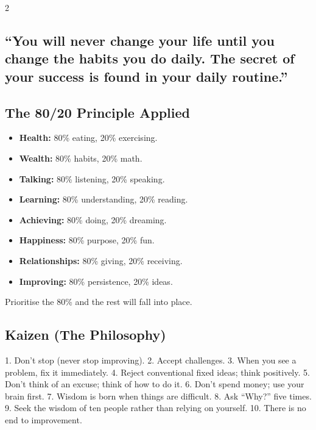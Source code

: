 \documentclass[10pt,a4paper]{article}
\begin{document}
\begin{multicols}{2}
\subsection{``You will never change your life until you change the habits you do daily. The secret of your success is found in your daily routine.''}

\subsection{The 80/20 Principle Applied}
\begin{itemize}
\item \textbf{Health:} 80\% eating, 20\% exercising.
\item \textbf{Wealth:} 80\% habits, 20\% math.
\item \textbf{Talking:} 80\% listening, 20\% speaking.
\item \textbf{Learning:} 80\% understanding, 20\% reading.
\item \textbf{Achieving:} 80\% doing, 20\% dreaming.
\item \textbf{Happiness:} 80\% purpose, 20\% fun.
\item \textbf{Relationships:} 80\% giving, 20\% receiving.
\item \textbf{Improving:} 80\% persistence, 20\% ideas.
\end{itemize}
Prioritise the 80\% and the rest will fall into place.

\subsection{Kaizen (The Philosophy)}
1. Don't stop (never stop improving). 2. Accept challenges. 3. When you see a problem, fix it immediately. 4. Reject conventional fixed ideas; think positively. 5. Don't think of an excuse; think of how to do it. 6. Don't spend money; use your brain first. 7. Wisdom is born when things are difficult. 8. Ask ``Why?'' five times. 9. Seek the wisdom of ten people rather than relying on yourself. 10. There is no end to improvement.

\end{multicols}
\end{document}
